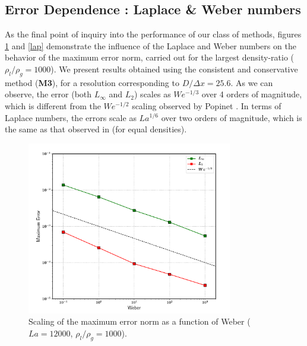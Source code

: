 \subsection*{Error Dependence : Laplace \& Weber numbers}

As the final point of inquiry into the performance of our class of methods, figures \ref{web} and \ref{lap} demonstrate the influence of the Laplace and Weber numbers on the behavior of the maximum error norm, carried out for the largest density-ratio ($\rho_l/\rho_g = 1000$). We present results obtained using the consistent and conservative method (\textbf{M3}), for a resolution corresponding to $D / \Delta x = 25.6$. As we can observe, the error (both $L_\infty$ and $L_2$) scales as $We^{-1/3}$ over 4 orders of magnitude, which is different from the $We^{-1/2}$ scaling observed by Popinet \cite{popinet2009accurate} . In terms of Laplace numbers, the errors scale as $La^{1/6}$ over two orders of magnitude, which is the same as that observed in \cite{popinet2009accurate} (for equal densities).

\begin{figure}
    \centering
    \includegraphics[width = 0.8\textwidth]{plots/droplet_advect/webers.pdf}
\caption{ Scaling of the maximum error norm as a function of Weber ($La = 12000$, $\rho_l / \rho_g = 1000$). }
    \label{web}
\end{figure}

